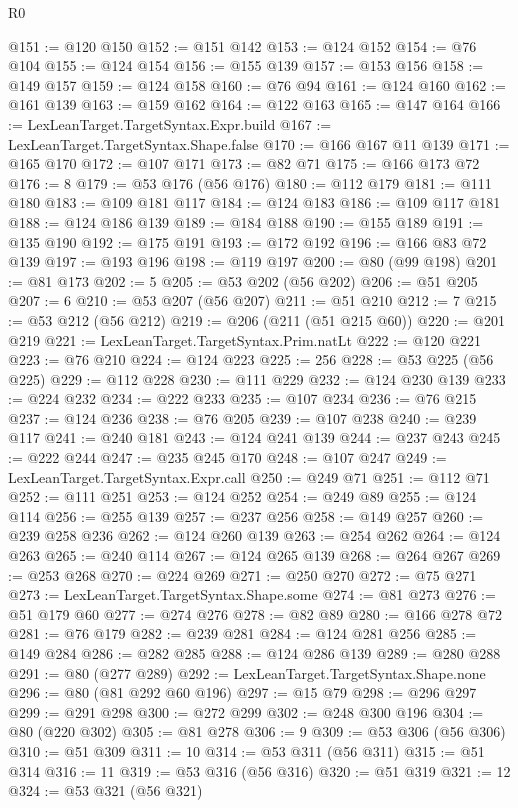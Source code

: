 \begin{lexlean}{R0}
\begin{coremodule}
@151 := @120 @150
@152 := @151 @142
@153 := @124 @152
@154 := @76 @104
@155 := @124 @154
@156 := @155 @139
@157 := @153 @156
@158 := @149 @157
@159 := @124 @158
@160 := @76 @94
@161 := @124 @160
@162 := @161 @139
@163 := @159 @162
@164 := @122 @163
@165 := @147 @164
@166 := LexLeanTarget.TargetSyntax.Expr.build
@167 := LexLeanTarget.TargetSyntax.Shape.false
@170 := @166 @167 @11 @139
@171 := @165 @170
@172 := @107 @171
@173 := @82 @71
@175 := @166 @173 @72
@176 := 8
@179 := @53 @176 (@56 @176)
@180 := @112 @179
@181 := @111 @180
@183 := @109 @181 @117
@184 := @124 @183
@186 := @109 @117 @181
@188 := @124 @186 @139
@189 := @184 @188
@190 := @155 @189
@191 := @135 @190
@192 := @175 @191
@193 := @172 @192
@196 := @166 @83 @72 @139
@197 := @193 @196
@198 := @119 @197
@200 := @80 (@99 @198)
@201 := @81 @173
@202 := 5
@205 := @53 @202 (@56 @202)
@206 := @51 @205
@207 := 6
@210 := @53 @207 (@56 @207)
@211 := @51 @210
@212 := 7
@215 := @53 @212 (@56 @212)
@219 := @206 (@211 (@51 @215 @60))
@220 := @201 @219
@221 := LexLeanTarget.TargetSyntax.Prim.natLt
@222 := @120 @221
@223 := @76 @210
@224 := @124 @223
@225 := 256
@228 := @53 @225 (@56 @225)
@229 := @112 @228
@230 := @111 @229
@232 := @124 @230 @139
@233 := @224 @232
@234 := @222 @233
@235 := @107 @234
@236 := @76 @215
@237 := @124 @236
@238 := @76 @205
@239 := @107 @238
@240 := @239 @117
@241 := @240 @181
@243 := @124 @241 @139
@244 := @237 @243
@245 := @222 @244
@247 := @235 @245 @170
@248 := @107 @247
@249 := LexLeanTarget.TargetSyntax.Expr.call
@250 := @249 @71
@251 := @112 @71
@252 := @111 @251
@253 := @124 @252
@254 := @249 @89
@255 := @124 @114
@256 := @255 @139
@257 := @237 @256
@258 := @149 @257
@260 := @239 @258 @236
@262 := @124 @260 @139
@263 := @254 @262
@264 := @124 @263
@265 := @240 @114
@267 := @124 @265 @139
@268 := @264 @267
@269 := @253 @268
@270 := @224 @269
@271 := @250 @270
@272 := @75 @271
@273 := LexLeanTarget.TargetSyntax.Shape.some
@274 := @81 @273
@276 := @51 @179 @60
@277 := @274 @276
@278 := @82 @89
@280 := @166 @278 @72
@281 := @76 @179
@282 := @239 @281
@284 := @124 @281 @256
@285 := @149 @284
@286 := @282 @285
@288 := @124 @286 @139
@289 := @280 @288
@291 := @80 (@277 @289)
@292 := LexLeanTarget.TargetSyntax.Shape.none
@296 := @80 (@81 @292 @60 @196)
@297 := @15 @79
@298 := @296 @297
@299 := @291 @298
@300 := @272 @299
@302 := @248 @300 @196
@304 := @80 (@220 @302)
@305 := @81 @278
@306 := 9
@309 := @53 @306 (@56 @306)
@310 := @51 @309
@311 := 10
@314 := @53 @311 (@56 @311)
@315 := @51 @314
@316 := 11
@319 := @53 @316 (@56 @316)
@320 := @51 @319
@321 := 12
@324 := @53 @321 (@56 @321)

\end{coremodule}
\end{lexlean}
